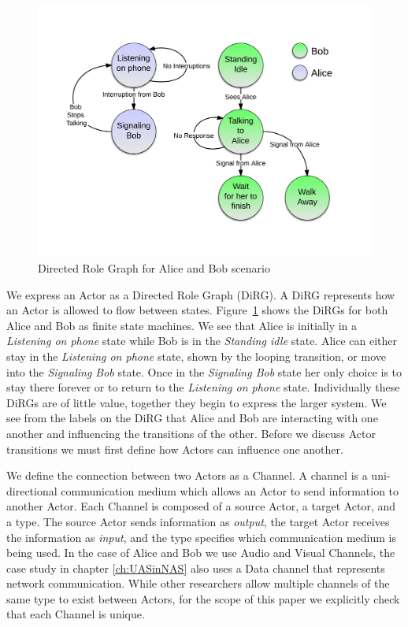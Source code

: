 \begin{figure}[h]
\begin{center}
\includegraphics[width=\textwidth]{ab_dirg.png}
\caption{Directed Role Graph for Alice and Bob scenario}
\label{fig:ab_dirg}
\end{center}
\end{figure}

We express an Actor as a Directed Role Graph (DiRG).  A DiRG represents how an Actor is allowed to flow between states.  Figure~\ref{fig:ab_dirg} shows the DiRGs for both Alice and Bob as finite state machines.  We see that Alice is initially in a {\em Listening on phone} state while Bob is in the {\em Standing idle} state.  Alice can either stay in the {\em Listening on phone} state, shown by the looping transition, or move into the {\em Signaling Bob} state.  Once in the {\em Signaling Bob} state her only choice is to stay there forever or to return to the {\em Listening on phone} state.  Individually these DiRGs are of little value, together they begin to express the larger system.  We see from the labels on the DiRG that Alice and Bob are interacting with one another and influencing the transitions of the other.  Before we discuss Actor transitions we must first define how Actors can influence one another.

We define the connection between two Actors as a Channel.  A channel is a uni-directional communication medium which allows an Actor to send information to another Actor.  Each Channel is composed of a source Actor, a target Actor, and a type.  The source Actor sends information as {\em output}, the target Actor receives the information as {\em input}, and the type specifies which communication medium is being used.  In the case of Alice and Bob we use Audio and Visual Channels\cite{wickens2002multiple}, the case study in chapter \ref{ch:UASinNAS} also uses a Data channel that represents network communication.  While other researchers allow multiple channels of the same type to exist between Actors\cite{FVHMS}, for the scope of this paper we explicitly check that each Channel is unique.  


